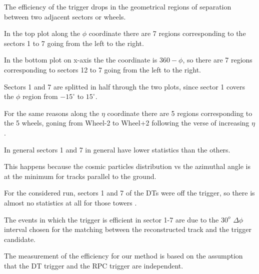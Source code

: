 The efficiency of the trigger drops in the geometrical regions
 of separation between two adjacent sectors or wheels.

In the top plot along the $\phi$ coordinate there are 7 regions
 corresponding to the sectors 1 to 7 going from the left to the right.

In the bottom plot on x-axis the the coordinate is $360 - \phi$,
so there are 7 regions corresponding to sectors 12 to 7 
going from the left to the right.

Sectors 1 and 7 are splitted in half through the two plots,
 since sector 1 covers the $\phi$
region from $-15^\circ$ to $15^\circ$. 

For the same reasons along the $\eta$ coordinate 
there are 5 regions corresponding to the 5 wheels,
goning from Wheel-2 to Wheel+2 following the verse of 
increasing $\eta$. 




In general sectors 1 and 7 in general have 
lower statistics than the others.

This happens because the cosmic particles
distribution vs the azimuthal angle
is at the minimum for tracks
parallel to the ground.

For the considered run, sectors 1 and 7 of the DTs were off the trigger,
so there is almost no statistics at all for those towers .

The events in which the trigger is efficient in sector 1-7 are due
to the  $30^o$   $\Delta \phi$ interval chosen for the matching 
between the reconstructed track and the trigger candidate.








The measurement of the efficiency for our method is based on the assumption that 
the DT trigger and the RPC trigger are independent.


